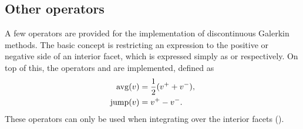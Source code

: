 \subsection{Other operators}
\label{ufl:sec:conditionals}

A few operators are provided for the implementation of discontinuous
Galerkin methods.  The basic concept is restricting an expression to
the positive or negative side of an interior facet, which is expressed
simply as  or  respectively. On top of
this, the operators  and  are implemented,
defined as
\begin{align}
\operatorname{avg}(v)  &= \frac 1 2 (v^+ + v^-), \\
\operatorname{jump}(v) &= v^+ - v^- .
\end{align}
These operators can only be used when integrating over the interior
facets ().

%
%
%

